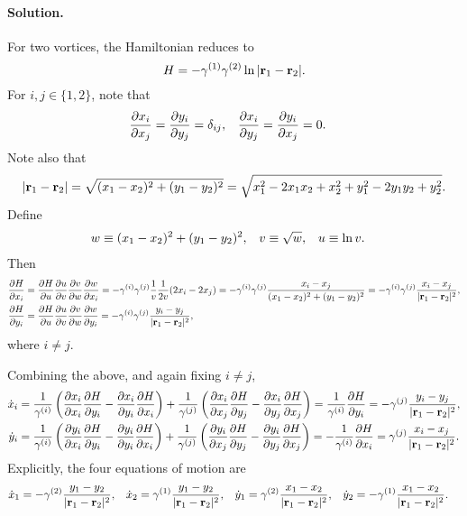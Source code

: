 \documentclass[11pt]{article}
\newcommand{\beq}{\begin{equation*}}
\newcommand{\eeq}{\end{equation*}}
\newenvironment{solution}
{
    \paragraph{Solution.}
    \ignorespaces
}
{
    \bigskip
}
\begin{document}
\begin{solution}
	For two vortices, the Hamiltonian reduces to
	\beq
		H = -\gamq \gamw \ln|\vrq - \vrw|.
	\eeq
	For $i, j \in \{ 1, 2 \}$, note that
	\begin{align*}
		\pdv{x_i}{x_j} &= \pdv{y_i}{y_j} = \delta_{ij}, &
		\pdv{x_i}{y_j} &= \pdv{y_i}{x_j} = 0.
	\end{align*}
	Note also that
	\beq
		|\vrq - \vrw| = \sqrt{(\xq - \xw)^2 + (\yq - \yw)^2}
		= \sqrt{\xq^2 - 2 \xq \xw + \xw^2 + \yq^2 - 2 \yq \yw + \yw^2}.
	\eeq
	Define
	\begin{align*}
		w &\equiv (x_1 - x_2)^2 + (y_1 - y_2)^2, &
		v &\equiv \sqrt{w}, &
		u &\equiv \ln{v}.
	\end{align*}
	Then
	\begin{align*}
		\pdv{H}{x_i} &= \pdv{H}{u} \pdv{u}{v} \pdv{v}{w} \pdv{w}{x_i}
		= -\gamma^{(i)} \gamma^{(j)} \frac{1}{v} \frac{1}{2v} (2 x_i - 2 x_j)
		= -\gamma^{(i)} \gamma^{(j)} \frac{x_i - x_j}{(x_1 - x_2)^2 + (y_1 - y_2)^2}
		= -\gamma^{(i)} \gamma^{(j)} \frac{x_i - x_j}{|\mathbf{r}_1 - \mathbf{r}_2|^2}, \\
		\pdv{H}{y_i} &= \pdv{H}{u} \pdv{u}{v} \pdv{v}{w} \pdv{w}{y_i}
		= -\gamma^{(i)} \gamma^{(j)} \frac{y_i - y_j}{|\mathbf{r}_1 - \mathbf{r}_2|^2},
	\end{align*}
	where $i \neq j$.
	
	Combining the above, and again fixing $i \neq j$,
	\begin{align*}
		\dot{x}_i &= \frac{1}{\gamma^{(i)}} \left( \pdv{x_i}{x_i} \pdv{H}{y_i} - \pdv{x_i}{y_i} \pdv{H}{x_i} \right) + \frac{1}{\gamma^{(j)}} \left( \pdv{x_i}{x_j} \pdv{H}{y_j} - \pdv{x_i}{y_j} \pdv{H}{x_j} \right)
		= \frac{1}{\gamma^{(i)}} \pdv{H}{y_i}
		= -\gamma^{(j)} \frac{y_i - y_j}{|\mathbf{r}_1 - \mathbf{r}_2|^2}, \\
		\dot{y}_i &= \frac{1}{\gamma^{(i)}} \left( \pdv{y_i}{x_i} \pdv{H}{y_i} - \pdv{y_i}{y_i} \pdv{H}{x_i} \right) + \frac{1}{\gamma^{(j)}} \left( \pdv{y_i}{x_j} \pdv{H}{y_j} - \pdv{y_i}{y_j} \pdv{H}{x_j} \right)
		= -\frac{1}{\gamma^{(i)}} \pdv{H}{x_i}
		= \gamma^{(j)} \frac{x_i - x_j}{|\mathbf{r}_1 - \mathbf{r}_2|^2}.
	\end{align*}
	Explicitly, the four equations of motion are
	\begin{align*}
		\dot{x}_1 &= -\gamma^{(2)} \frac{y_1 - y_2}{|\mathbf{r}_1 - \mathbf{r}_2|^2}, &
		\dot{x}_2 &= \gamma^{(1)} \frac{y_1 - y_2}{|\mathbf{r}_1 - \mathbf{r}_2|^2}, &
		\dot{y}_1 &= \gamma^{(2)} \frac{x_1 - x_2}{|\mathbf{r}_1 - \mathbf{r}_2|^2}, &
		\dot{y}_2 &= -\gamma^{(1)} \frac{x_1 - x_2}{|\mathbf{r}_1 - \mathbf{r}_2|^2}.
	\end{align*}
\end{solution}


\newcommand{\Px}{P_x}
\newcommand{\Py}{P_y}
\end{document}
